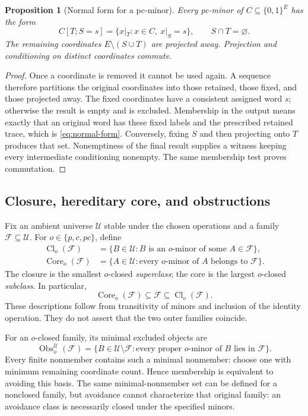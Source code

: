 \documentclass[11pt]{article}
\newtheorem{proposition}{Proposition}[section]
\theoremstyle{definition}
\newcommand{\bits}{\{0,1\}}
\newcommand{\Obs}{\operatorname{Obs}}
\newcommand{\Cl}{\operatorname{Cl}}
\newcommand{\Core}{\operatorname{Core}}
\begin{document}
\begin{proposition}[Normal form for a pc-minor]\label{prop:normal-form}
Every pc-minor of $C\subseteq\bits^E$ has the form
\begin{equation}\label{eq:normal-form}
 C[T;S=s]=\{x|_T:x\in C,\ x|_S=s\},\qquad S\cap T=\varnothing.
\end{equation}
The remaining coordinates $E\setminus(S\cup T)$ are projected away.
Projection and conditioning on distinct coordinates commute.
\end{proposition}
\begin{proof}
Once a coordinate is removed it cannot be used again. A sequence therefore
partitions the original coordinates into those retained, those fixed, and
those projected away. The fixed coordinates have a consistent assigned word
$s$; otherwise the result is empty and is excluded. Membership in the output
means exactly that an original word has these fixed labels and the prescribed
retained trace, which is \eqref{eq:normal-form}. Conversely, fixing $S$ and
then projecting onto $T$ produces that set. Nonemptiness of the final result
supplies a witness keeping every intermediate conditioning nonempty.
The same membership test proves commutation.
\end{proof}

\subsection{Closure, hereditary core, and obstructions}

Fix an ambient universe $\mathcal U$ stable under the chosen operations and
a family $\mathcal F\subseteq\mathcal U$. For $o\in\{p,c,pc\}$, define
\begin{align*}
 \Cl_o(\mathcal F)&=\{B\in\mathcal U:B\text{ is an $o$-minor of some }A\in\mathcal F\},\\
 \Core_o(\mathcal F)&=\{A\in\mathcal U:\text{every $o$-minor of }A\text{ belongs to }\mathcal F\}.
\end{align*}
The closure is the smallest $o$-closed \emph{superclass}; the core is the
largest $o$-closed \emph{subclass}. In particular,
\[
 \Core_o(\mathcal F)\subseteq\mathcal F\subseteq\Cl_o(\mathcal F).
\]
These descriptions follow from transitivity of minors and inclusion of the
identity operation. They do not assert that the two outer families coincide.

For an $o$-closed family, its minimal excluded objects are
\[
 \Obs_o^{\mathcal U}(\mathcal F)
 =\{B\in\mathcal U\setminus\mathcal F:
       \text{every proper $o$-minor of }B\text{ lies in }\mathcal F\}.
\]
Every finite nonmember contains such a minimal nonmember: choose one with
minimum remaining coordinate count. Hence membership is equivalent to
avoiding this basis. The same minimal-nonmember set can be defined for a
nonclosed family, but avoidance cannot characterize that original family:
an avoidance class is necessarily closed under the specified minors.
\end{document}
